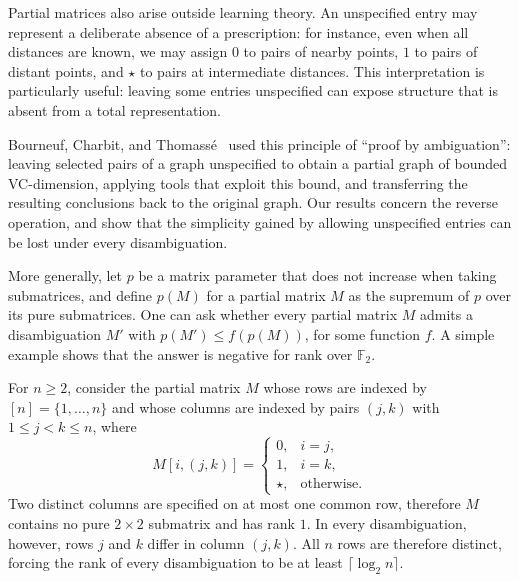 \documentclass[11pt]{article}
\theoremstyle{remark}
\begin{document}
\smallskip

Partial matrices also arise outside learning theory.
An unspecified entry may represent a deliberate absence of a prescription: for instance, even when all distances are known, we may assign $0$ to pairs of nearby points, $1$ to pairs of distant points, and $\star$ to pairs at intermediate distances.
This interpretation is particularly useful: leaving some entries unspecified can expose structure that is absent from a total representation.

Bourneuf, Charbit, and Thomassé~\cite{BCT25} used this principle of ``proof by ambiguation'': leaving selected pairs of a graph unspecified to obtain a partial graph of bounded VC-dimension, applying tools that exploit this bound, and transferring the resulting conclusions back to the original graph.
Our results concern the reverse operation, and show that the simplicity gained by allowing unspecified entries can be lost under every disambiguation.

More generally, let $p$ be a matrix parameter that does not increase when taking submatrices, and define $p(M)$ for a partial matrix $M$ as the supremum of $p$ over its pure submatrices.
One can ask whether every partial matrix $M$ admits a disambiguation $M'$ with
$p(M')\leq f(p(M))$, for some function $f$.
A simple example shows that the answer is negative for rank over $\mathbb F_2$.

For $n\geq2$, consider the partial matrix $M$ whose rows are indexed by $[n]=\{1,\ldots,n\}$ and whose columns are indexed by pairs $(j,k)$ with $1\leq j<k\leq n$, where
\[
M[i,(j,k)]=
\begin{cases}
0, & i=j,\\
1, & i=k,\\
\star, & \text{otherwise}.
\end{cases}
\]
Two distinct columns are specified on at most one common row, therefore $M$ contains no pure $2\times2$ submatrix and has rank $1$.
In every disambiguation, however, rows $j$ and $k$ differ in column $(j,k)$.
All $n$ rows are therefore distinct, forcing the rank of every disambiguation to be at least $\lceil\log_2 n\rceil$.
\end{document}
